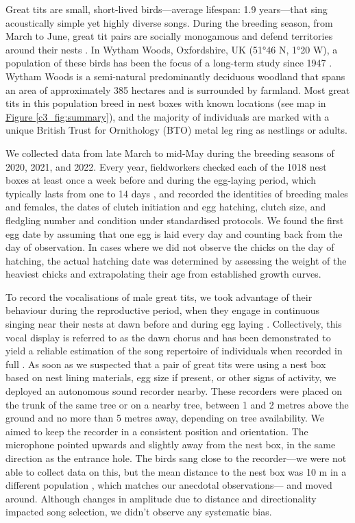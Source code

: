 Great tits are small, short-lived birds---average lifespan: 1.9 years---that sing acoustically simple yet highly diverse songs. During the breeding season, from March to June, great tit pairs are socially monogamous and defend territories around their nests \parencite{hinde1952}. In Wytham Woods, Oxfordshire, UK (51°46 N, 1°20 W), a population of these birds has been the focus of a long-term study since 1947 \parencite{lack1964}. Wytham Woods is a semi-natural predominantly deciduous woodland that spans an area of approximately 385 hectares and is surrounded by farmland. Most great tits in this population breed in nest boxes with known locations (see map in \hyperref[c3_fig:summary]{Figure \ref*{c3_fig:summary}}), and the majority of individuals are marked with a unique British Trust for Ornithology (BTO) metal leg ring as nestlings or adults. 

We collected data from late March to mid-May during the breeding seasons of 2020, 2021, and 2022. Every year, fieldworkers checked each of the 1018 nest boxes at least once a week before and during the egg-laying period, which typically lasts from one to 14 days \parencite{Perrins1965}, and recorded the identities of breeding males and females, the dates of clutch initiation and egg hatching, clutch size, and fledgling number and condition under standardised protocols. We found the first egg date by assuming that one egg is laid every day and counting back from the day of observation. In cases where we did not observe the chicks on the day of hatching, the actual hatching date was determined by assessing the weight of the heaviest chicks and extrapolating their age from established growth curves.

To record the vocalisations of male great tits, we took advantage of their behaviour during the reproductive period, when they engage in continuous singing near their nests at dawn before and during egg laying \parencite{mace1987}. Collectively, this vocal display is referred to as the dawn chorus and has been demonstrated to yield a reliable estimation of the song repertoire of individuals when recorded in full \parencite{rivera-gutierrez2012, vanduyse2005}. As soon as we suspected that a pair of great tits were using a nest box based on nest lining materials, egg size if present, or other signs of activity, we deployed an autonomous sound recorder nearby. These recorders were placed on the trunk of the same tree or on a nearby tree, between 1 and 2 metres above the ground and no more than 5 metres away, depending on tree availability. We aimed to keep the recorder in a consistent position and orientation. The microphone pointed upwards and slightly away from the nest box, in the same direction as the entrance hole. The birds sang close to the recorder---we were not able to collect data on this, but the mean distance to the nest box was 10 m in a different population \parencite{halfwerk2012}, which matches our anecdotal observations--- and moved around. Although changes in amplitude due to distance and directionality impacted song selection, we didn't observe any systematic bias.

